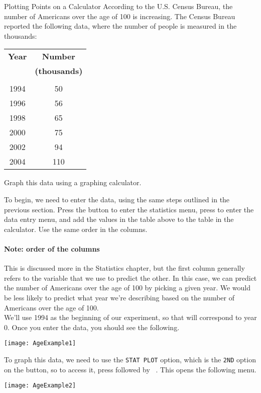 \begin{example}{Plotting Points on a Calculator}
According to the U.S. Census Bureau, the number of Americans over the age of 100 is increasing.  The Census Bureau reported the following data, where the number of people is measured in the thousands:
\begin{center}
\begin{tabular}{c c}
\textbf{Year} & \textbf{Number}\\
& \textbf{(thousands)}\\
\hline
& \\
1994 & 50\\
1996 & 56\\
1998 & 65\\
2000 & 75\\
2002 & 94\\
2004 & 110
\end{tabular}
\end{center}

Graph this data using a graphing calculator.

\sol
To begin, we need to enter the data, using the same steps outlined in the previous section.  Press the  button to enter the statistics menu, press  to enter the data entry menu, and add the values in the table above to the table in the calculator.  Use the same order in the columns.

\paragraph{Note: order of the columns} This is discussed more in the Statistics chapter, but the first column generally refers to the variable that we use to predict the other.  In this case, we can predict the number of Americans over the age of 100 by picking a given year.  We would be less likely to predict what year we're describing based on the number of Americans over the age of 100.\\

We'll use 1994 as the beginning of our experiment, so that will correspond to year 0.  Once you enter the data, you should see the following.
\begin{center}
\texttt{[image: AgeExample1]}
\end{center}

To graph this data, we need to use the \texttt{STAT PLOT} option, which is the \texttt{2ND} option on the  button, so to access it, press  followed by \ .  This opens the following menu.
\begin{center}
\texttt{[image: AgeExample2]}
\end{center}


\end{example}
